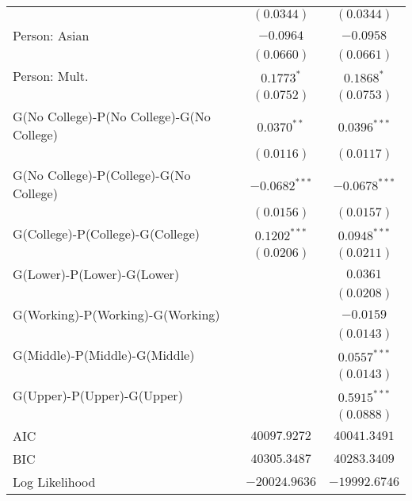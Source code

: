 \begin{center}
\begin{longtable}{l c c}
                                          & $(0.0344)$      & $(0.0344)$      \\
Person: Asian                             & $-0.0964$       & $-0.0958$       \\
                                          & $(0.0660)$      & $(0.0661)$      \\
Person: Mult.                             & $0.1773^{*}$    & $0.1868^{*}$    \\
                                          & $(0.0752)$      & $(0.0753)$      \\
G(No College)-P(No College)-G(No College) & $0.0370^{**}$   & $0.0396^{***}$  \\
                                          & $(0.0116)$      & $(0.0117)$      \\
G(No College)-P(College)-G(No College)    & $-0.0682^{***}$ & $-0.0678^{***}$ \\
                                          & $(0.0156)$      & $(0.0157)$      \\
G(College)-P(College)-G(College)          & $0.1202^{***}$  & $0.0948^{***}$  \\
                                          & $(0.0206)$      & $(0.0211)$      \\
G(Lower)-P(Lower)-G(Lower)                &                 & $0.0361$        \\
                                          &                 & $(0.0208)$      \\
G(Working)-P(Working)-G(Working)          &                 & $-0.0159$       \\
                                          &                 & $(0.0143)$      \\
G(Middle)-P(Middle)-G(Middle)             &                 & $0.0557^{***}$  \\
                                          &                 & $(0.0143)$      \\
G(Upper)-P(Upper)-G(Upper)                &                 & $0.5915^{***}$  \\
                                          &                 & $(0.0888)$      \\
\midrule
AIC                                       & $40097.9272$    & $40041.3491$    \\
BIC                                       & $40305.3487$    & $40283.3409$    \\
Log Likelihood                            & $-20024.9636$   & $-19992.6746$   \\
\end{longtable}
\end{center}
